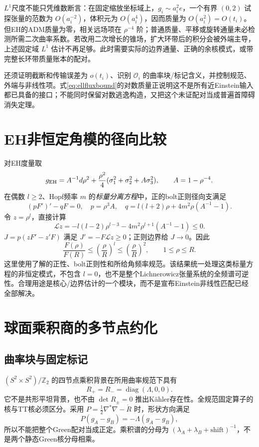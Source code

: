\documentclass[UTF8,a4paper,11pt,fontset=fandol]{ctexart}
\numberwithin{equation}{section}
\theoremstyle{definition}
\newcommand{\Z}{\mathbb Z}
\begin{document}
$L^1$尺度不能只凭维数断言：在固定缩放坐标域上，$g_i\sim a_i^2e$，一个有界 $(0,2)$ 试探张量的范数为 $O(a_i^{-2})$，体积元为 $O(a_i^4)$，因而质量为 $O(a_i^2)=O(t_i)$。但EH的ADM质量为零，相关远场项在 $\rho^{-4}$ 阶；普通质量、平移或旋转通量未必检测所需二次曲率系数。若改用二次增长的锥场，扩大环带后的积分会被外端主导，上述固定域 $L^1$ 估计不再足够。此时需要实际的边界通量、正确的余核模式，或带完整长环带质量账本的配对。

还须证明截断和传输误差为 $o(t_i)$、识别 $\mathcal O_i$ 的曲率块/标记含义，并控制规范、外端与非线性项。式\eqref{eq:ellfluxbound}的对数质量正说明这不是所有近Einstein输入都已具备的接口；不能同时保留对数逃逸构造，又把这个未证配对当成普遍首障碍消失定理。

\section{EH非恒定角模的径向比较}
对EH度量取
\[
g_{\rm EH}=A^{-1}d\rho^2+\frac{\rho^2}{4}
(\sigma_1^2+\sigma_2^2+A\sigma_3^2),\qquad A=1-\rho^{-4}.
\]
在偶数 $l\ge2$、Hopf频率 $m$ 的\emph{标量分离方程}中，正的bolt正则径向支满足
\[
(pF')'-qF=0,\quad p=\rho^3A,\quad
q=l(l+2)\rho+4m^2\rho(A^{-1}-1).
\]
令 $z=\rho^l$，直接计算
\[
\mathcal Lz=-l(l-2)\rho^{l-3}-4m^2\rho^{l+1}(A^{-1}-1)\le0.
\]
$J=p(zF'-z'F)$ 满足 $J'=-F\mathcal Lz\ge0$；正则边界给 $J\to0$。因此
\begin{equation}\label{eq:angular}
\frac{F(\rho)}{F(R)}\le\left(\frac{\rho}{R}\right)^l
\le\left(\frac{\rho}{R}\right)^2,\qquad1\le\rho\le R.
\end{equation}
这里使用了解的正性、bolt正则性和所给角频率规范。该结果统一处理这类标量方程的非恒定模式，不包含 $l=0$，也不是整个Lichnerowicz张量系统的全频谱可逆性。合理用途是核心/边界估计的一个模块，而不是宣布Einstein非线性匹配已经全部解决。

\section{球面乘积商的多节点约化}
\subsection{曲率块与固定标记}
$(S^2\times S^2)/\Z_2$ 的四节点乘积背景在所用曲率规范下具有
\[
R_+=R_-=\operatorname{diag}(\Lambda,0,0).
\]
它不是共形平坦背景，也不由 $\det R_\pm=0$ 推出K\"ahler存在性。全规范固定算子的核与TT核必须区分。采用 $P=\frac12\nabla^*\nabla-\mathring R$ 时，形状方向满足
\[
P(g_A-g_B)=-\Lambda(g_A-g_B),
\]
所以不能把整个Green配对当成正定。乘积谱的分母为 $(\lambda_A+\lambda_B+\text{shift})^{-1}$，不是两个静态Green核分母相乘。
\end{document}
